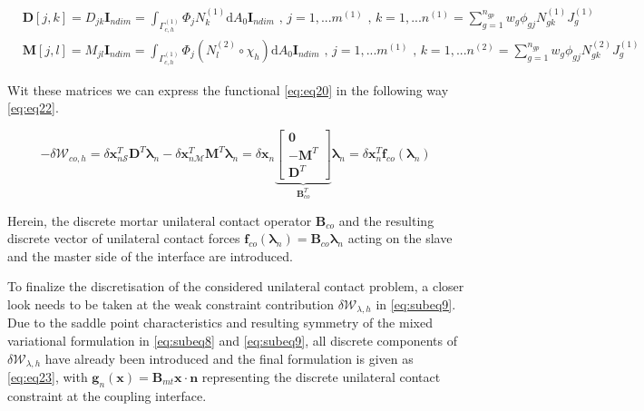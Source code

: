 \documentclass[a4paper,10pt]{article} %
\begin{document}
 \begin{subequations}\label{eq:eq21}
 \begin{align}
 & \mathbf{D}[j,k] = D_{jk} \mathbf{I}_{ndim} = \int_{\Gamma_{c,h}^{(1)}} \Phi_j N_k^{(1)}\text{d}A_0\mathbf{I}_{ndim}\text{ , } j=1,...m^{(1)}\text{ , } k= 1, ...n^{(1)} = \sum_{g = 1}^{n_{gp}} w_g \phi_{gj} N_{gk}^{(1)} J_g^{(1)} \\
 & \mathbf{M}[j,l] = M_{jl} \mathbf{I}_{ndim} = \int_{\Gamma_{c,h}^{(1)}} \Phi_j \left(N_l^{(2)} \circ \chi_h \right)\text{d}A_0\mathbf{I}_{ndim}\text{ , } j=1,...m^{(1)}\text{ , } k= 1, ...n^{(2)} = \sum_{g = 1}^{n_{gp}} w_g \phi_{gj} N_{gk}^{(2)} J_g^{(1)} 
 \end{align}
\end{subequations}

Wit these matrices we can express the functional \eqref{eq:eq20} in the following way \eqref{eq:eq22}.

\begin{equation}\label{eq:eq22}
 -\delta \mathcal{W}_{co,h} = \delta \mathbf{x}_{n\mathcal{S}}^T\mathbf{D}^T\boldsymbol{\lambda}_n - \delta \mathbf{x}_{n\mathcal{M}}^T\mathbf{M}^T\boldsymbol{\lambda}_n = \delta \mathbf{x}_n \underbrace{\left[\begin{array}{c} \mathbf{0} \\ -\mathbf{M}^T \\ \mathbf{D}^T\end{array} \right]}_{\mathbf{B}^T_{co}} \boldsymbol{\lambda}_n = \delta \mathbf{x}_n^T \mathbf{f}_{co}(\boldsymbol{\lambda}_n)
\end{equation}

Herein, the discrete mortar unilateral contact operator $\mathbf{B}_{co}$ and the resulting discrete vector of unilateral contact forces $\mathbf{f}_{co} (\boldsymbol{\lambda}_n) = \mathbf{B}_{co}\boldsymbol{\lambda}_n$ acting on the slave and the master side of the interface are introduced. 

To finalize the discretisation of the considered unilateral contact problem, a closer look needs to
be taken at the weak constraint contribution $\delta \mathcal{W}_{\lambda,h} $ in \eqref{eq:subeq9}. Due to the saddle point characteristics and resulting symmetry of the mixed variational formulation in \eqref{eq:subeq8}  and \eqref{eq:subeq9}, all discrete components of $\delta \mathcal{W}_{\lambda,h}$ have already been introduced and the final formulation is given as \eqref{eq:eq23}, with $\mathbf{g}_{n}(\mathbf{x}) = \mathbf{B}_{mt} \mathbf{x} \cdot \mathbf{n}$ representing the discrete unilateral contact constraint at the coupling interface.
\end{document}
